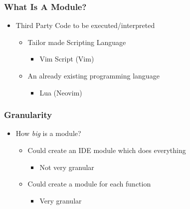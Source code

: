 \begin{frame}
  \frametitle{What Is A Module?}
  \begin{itemize}
    \item Third Party Code to be executed/interpreted
      \pause
      \begin{itemize}
        \item Tailor made Scripting Language
          \pause
          \begin{itemize}
            \item Vim Script (Vim)
              \pause
          \end{itemize}
        \item An already existing programming language
          \pause
          \begin{itemize}
            \item Lua (Neovim)
          \end{itemize}
      \end{itemize}
  \end{itemize}
\end{frame}

\begin{frame}
  \frametitle{Granularity}
  \begin{itemize}
    \item How \textit{big} is a module?
      \pause
      \begin{itemize}
        \item Could create an IDE module which does everything
          \pause
          \begin{itemize}
            \item Not very granular
          \end{itemize}
          \pause
        \item Could create a module for each function
          \begin{itemize}
              \pause
            \item Very granular
          \end{itemize}
      \end{itemize}
  \end{itemize}
\end{frame}

